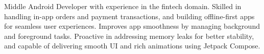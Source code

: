 
\begin{cvparagraph}
    Middle Android Developer with experience in the fintech domain.
    Skilled in handling in-app orders and payment transactions, and building offline-first apps for seamless user experiences.
    Improves app smoothness by managing background and foreground tasks.
    Proactive in addressing memory leaks for better stability, and capable of delivering smooth UI and rich animations using Jetpack Compose.
\end{cvparagraph}
